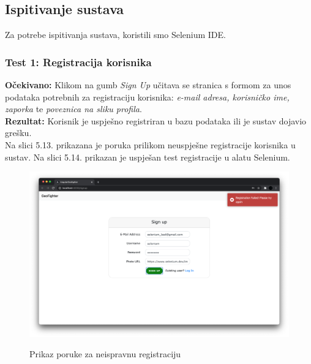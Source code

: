 			\eject
			
			\subsection{Ispitivanje sustava}
			
		    Za potrebe ispitivanja sustava, koristili smo Selenium IDE.
			\subsubsection{Test 1: Registracija korisnika}
			\textbf{Očekivano: } Klikom na gumb \textit{Sign Up} učitava se stranica s formom za unos podataka potrebnih za registraciju korisnika: \textit{e-mail adresa, korisničko ime, zaporka} te \textit{poveznica na sliku profila}.\\
			\textbf{Rezultat: } Korisnik  je  uspješno  registriran  u  bazu  podataka  ili  je  sustav  dojavio grešku.\\
			
			    Na slici 5.13. prikazana je poruka prilikom neuspješne registracije korisnika u sustav. Na slici 5.14. prikazan je uspješan test registracije u alatu Selenium.

			\begin{figure}[H]
				\centering
				\includegraphics[scale=0.27]{slike/SeleniumRegistrationFail.png} \\
				\caption{ Prikaz poruke za neispravnu registraciju}
				\label{fig:SeleniumRegistrationFail}
			\end{figure}

